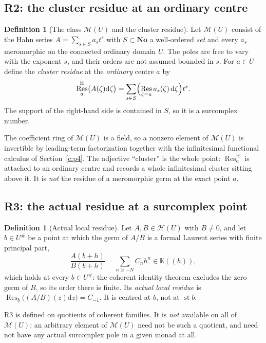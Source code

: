 \documentclass[11pt,a4paper]{article}
\numberwithin{equation}{section}
\theoremstyle{definition}
\newtheorem{definition}[theorem]{Definition}
\theoremstyle{remark}
\theoremstyle{plain}
\newcommand{\K}{\mathbb K}
\newcommand{\No}{\mathbf{No}}
\DeclareMathOperator{\st}{st}
\newcommand{\tm}{t}
\newcommand{\halo}[1]{#1^{\#}}
\newcommand{\Hc}{\mathcal H}
\newcommand{\Mc}{\mathcal M}
\DeclareMathOperator{\Res}{Res}                 %
\newcommand{\ResH}[1]{\Res^{\mathrm H}_{#1}}    %
\newcommand{\Resat}[1]{\Res_{#1}}               %
\newcommand{\dd}{\mathrm d}
\begin{document}
\subsection{R2: the cluster residue at an ordinary centre}
\label{d:sub:R2}

\begin{definition}[The class $\Mc(U)$ and the cluster residue]
\label{d:def:clusterres}
Let $\Mc(U)$ consist of the Hahn series $A=\sum_{s\in S}a_s\tm^{s}$
with $S\subset\No$ a well-ordered \emph{set} and every $a_s$
meromorphic on the connected ordinary domain $U$.  The poles are free to
vary with the exponent $s$, and their orders are not assumed bounded in
$s$.  For $a\in U$ define the \emph{cluster residue} at the
\emph{ordinary} centre $a$ by
\begin{equation}\label{d:eq:clusterres}
 \ResH{a}\bigl(A(\zeta)\dd\zeta\bigr)
  =\sum_{s\in S}\Bigl(\Res_{\zeta=a}a_s(\zeta)\,\dd\zeta\Bigr)\tm^{s}.
\end{equation}
The support of the right-hand side is contained in $S$, so it is a
surcomplex number.
\end{definition}

The coefficient ring of $\Mc(U)$ is a field, so a nonzero element of
$\Mc(U)$ is invertible by leading-term factorization together with the
infinitesimal functional calculus of Section~\ref{c:p4}.  The adjective ``cluster''
is the whole point: $\ResH{a}$ is attached to an ordinary centre and
records a whole infinitesimal cluster sitting above it.  It is
\emph{not} the residue of a meromorphic germ at the exact point $a$.

\subsection{R3: the actual residue at a surcomplex point}
\label{d:sub:R3}

\begin{definition}[Actual local residue]
\label{d:def:actualres}
Let $A,B\in\Hc(U)$ with $B\ne0$, and let $b\in\halo U$ be a point at
which the germ of $A/B$ is a formal Laurent series with finite
principal part,
\[
 \frac{A(b+h)}{B(b+h)}=\sum_{n\ge-N}C_nh^{n}\in\K((h)),
\]
which holds at every $b\in\halo U$: the coherent identity theorem
excludes the zero germ of $B$, so its order there is finite.
Its \emph{actual local residue} is
$\Resat{b}\bigl((A/B)(z)\dd z\bigr)=C_{-1}$.  It is centred at $b$, not
at $\st b$.
\end{definition}

R3 is defined on quotients of coherent families.  It is \emph{not}
available on all of $\Mc(U)$: an arbitrary element of $\Mc(U)$ need not
be such a quotient, and need not have any actual surcomplex pole in a
given monad at all.
\end{document}
